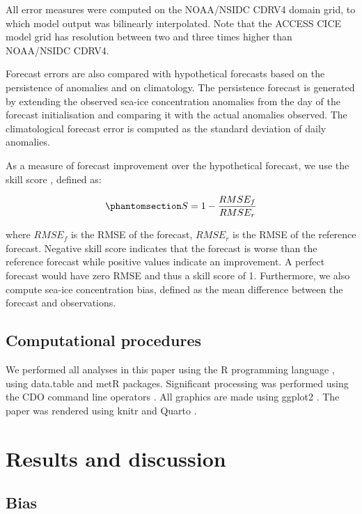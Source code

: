 \documentclass[tc, manuscript]{copernicus}
\begin{document}
All error measures were computed on the NOAA/NSIDC CDRV4 domain grid, to
which model output was bilinearly interpolated. Note that the ACCESS
CICE model grid has resolution between two and three times higher than
NOAA/NSIDC CDRV4.

Forecast errors are also compared with hypothetical forecasts based on
the persistence of anomalies and on climatology. The persistence
forecast is generated by extending the observed sea-ice concentration
anomalies from the day of the forecast initialisation and comparing it
with the actual anomalies observed. The climatological forecast error is
computed as the standard deviation of daily anomalies.

As a measure of forecast improvement over the hypothetical forecast, we
use the skill score \citep{murphy1985}, defined as:

\begin{equation}\phantomsection\label{eq-skill}{
S = 1 - \frac{RMSE_{f}}{RMSE_{r}}
}\end{equation}

where \(RMSE_{f}\) is the RMSE of the forecast, \(RMSE_{r}\) is the RMSE
of the reference forecast. Negative skill score indicates that the
forecast is worse than the reference forecast while positive values
indicate an improvement. A perfect forecast would have zero RMSE and
thus a skill score of 1. Furthermore, we also compute sea-ice
concentration bias, defined as the mean difference between the forecast
and observations.

\subsection{Computational procedures}\label{computational-procedures}

We performed all analyses in this paper using the R programming language
\citep{rcoreteam2020}, using data.table \citep{dowle2020} and metR
\citep{campitelli2020} packages. Significant processing was performed
using the CDO command line operators \citep{schulzweida2023}. All
graphics are made using ggplot2 \citep{wickham2009}. The paper was
rendered using knitr and Quarto \citep{xie2015, allaire2022}.

\section{Results and discussion}\label{results-and-discussion}

\subsection{Bias}\label{bias}
\end{document}

